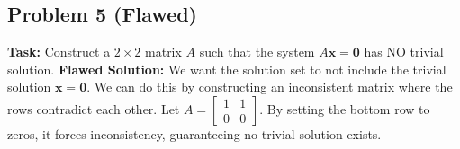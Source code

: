 \documentclass[11pt]{article}
\begin{document}
\vspace{2cm}

\subsection*{Problem 5 (Flawed)}
\textbf{Task:} Construct a $2 \times 2$ matrix $A$ such that the system $A\mathbf{x} = \mathbf{0}$ has NO trivial solution.
\textbf{Flawed Solution:}
We want the solution set to not include the trivial solution $\mathbf{x} = \mathbf{0}$. We can do this by constructing an inconsistent matrix where the rows contradict each other. Let $A = \begin{bmatrix} 1 & 1 \\ 0 & 0 \end{bmatrix}$. By setting the bottom row to zeros, it forces inconsistency, guaranteeing no trivial solution exists.
\end{document}
